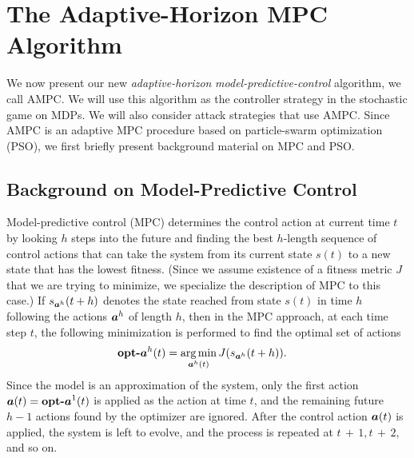 \section{The Adaptive-Horizon MPC Algorithm} %
\label{sec:ampc}

We now present our new \emph{adaptive-horizon} \emph{model-predictive-control} algorithm, we call AMPC. We will use this algorithm as the controller strategy in the stochastic game on MDPs. We will also consider attack strategies that use AMPC. Since AMPC is an adaptive MPC procedure based on particle-swarm optimization (PSO), we first
briefly present background material on MPC and PSO.

\subsection{Background on Model-Predictive Control}
Model-predictive control (MPC) determines the control action at current time $t$ by looking $h$ steps into the future and finding the best $h$-length sequence of control actions that can take the system from its current state $s(t)$ to a new state that has the lowest fitness. (Since we assume existence of a fitness metric $J$ that we are trying to minimize, we specialize the description of MPC to this case.) 
If ${s}_{{\boldsymbol {a}}^h}(t+h)$ denotes the state reached from state ${s}(t)$ in time $h$ following the actions ${\boldsymbol {a}}^h$ of length $h$, then in the MPC approach, at each time step $t$, the following minimization is performed to find the optimal set of actions
\begin{align}
&\textbf{opt-${\boldsymbol {a}}$}^{h}(t)=\operatorname*{\arg\min}_{{\boldsymbol {a}}^h(t)}J(s_{{\boldsymbol {a}}^h}(t+h)).
\label{eq:opt}
\end{align}
Since the model is an approximation of the system, only the first action ${\boldsymbol {a}}(t) = \textbf{opt-${\boldsymbol {a}}$}^{1}(t)$ is applied as the action at time $t$,
and the remaining future $h-1$ actions found by the optimizer are ignored.  After the control action ${\boldsymbol {a}}(t)$ is applied, the system is left to evolve, and the process is repeated at $t\,{+}\,1, t\,{+}\,2,$ and so on.
%
%
%
%

